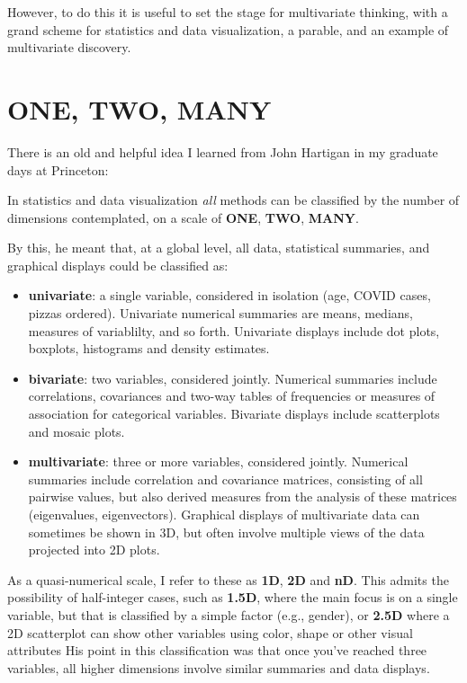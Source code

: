 \documentclass[
  letterpaper,
  10pt,
  krantz2]{krantz}
\providecommand{\tightlist}{%
  \setlength{\itemsep}{0pt}\setlength{\parskip}{0pt}}\usepackage{longtable,booktabs,array}
\renewenvironment{quote}{\begin{VF}}{\end{VF}}
\begin{document}
However, to do this it is useful to set the stage for multivariate
thinking, with a grand scheme for statistics and data visualization, a
parable, and an example of multivariate discovery.

\hypertarget{one-two-many}{%
\section*{ONE, TWO, MANY}\label{one-two-many}}


There is an old and helpful idea I learned from John Hartigan in my
graduate days at Princeton:

\begin{quote}
In statistics and data visualization \emph{all} methods can be
classified by the number of dimensions contemplated, on a scale of
\textbf{ONE}, \textbf{TWO}, \textbf{MANY}.
\end{quote}

By this, he meant that, at a global level, all data, statistical
summaries, and graphical displays could be classified as:

\begin{itemize}
\tightlist
\item
  \textbf{univariate}: a single variable, considered in isolation (age,
  COVID cases, pizzas ordered). Univariate numerical summaries are
  means, medians, measures of variablilty, and so forth. Univariate
  displays include dot plots, boxplots, histograms and density
  estimates.
\item
  \textbf{bivariate}: two variables, considered jointly. Numerical
  summaries include correlations, covariances and two-way tables of
  frequencies or measures of association for categorical variables.
  Bivariate displays include scatterplots and mosaic plots.
\item
  \textbf{multivariate}: three or more variables, considered jointly.
  Numerical summaries include correlation and covariance matrices,
  consisting of all pairwise values, but also derived measures from the
  analysis of these matrices (eigenvalues, eigenvectors). Graphical
  displays of multivariate data can sometimes be shown in 3D, but often
  involve multiple views of the data projected into 2D plots.
\end{itemize}

As a quasi-numerical scale, I refer to these as \textbf{1D}, \textbf{2D}
and \textbf{nD}. This admits the possibility of half-integer cases, such
as \textbf{1.5D}, where the main focus is on a single variable, but that
is classified by a simple factor (e.g., gender), or \textbf{2.5D} where
a 2D scatterplot can show other variables using color, shape or other
visual attributes His point in this classification was that once you've
reached three variables, all higher dimensions involve similar summaries
and data displays.
\end{document}
